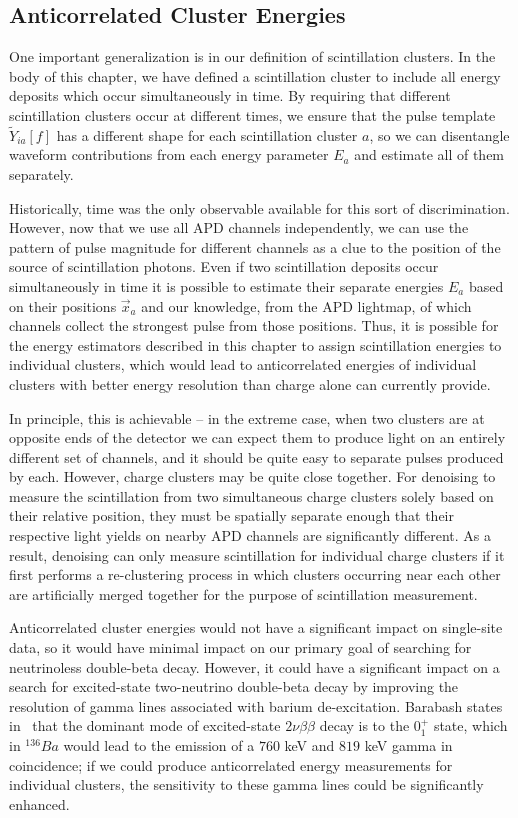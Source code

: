 \subsection{Anticorrelated Cluster Energies}\label{sec:AnticorrelatedClusterEnergies}

One important generalization is in our definition of scintillation clusters.  In the body of this chapter, we have defined a scintillation cluster to include all energy deposits which occur simultaneously in time.  By requiring that different scintillation clusters occur at different times, we ensure that the pulse template $\widetilde{Y}_{ia}[f]$ has a different shape for each scintillation cluster $a$, so we can disentangle waveform contributions from each energy parameter $E_a$ and estimate all of them separately.

Historically, time was the only observable available for this sort of discrimination.  However, now that we use all APD channels independently, we can use the pattern of pulse magnitude for different channels as a clue to the position of the source of scintillation photons.  Even if two scintillation deposits occur simultaneously in time it is possible to estimate their separate energies $E_a$ based on their positions $\vec{x}_a$ and our knowledge, from the APD lightmap, of which channels collect the strongest pulse from those positions.  Thus, it is possible for the energy estimators described in this chapter to assign scintillation energies to individual clusters, which would lead to anticorrelated energies of individual clusters with better energy resolution than charge alone can currently provide.

In principle, this is achievable -- in the extreme case, when two clusters are at opposite ends of the detector we can expect them to produce light on an entirely different set of channels, and it should be quite easy to separate pulses produced by each.  However, charge clusters may be quite close together.  For denoising to measure the scintillation from two simultaneous charge clusters solely based on their relative position, they must be spatially separate enough that their respective light yields on nearby APD channels are significantly different.  As a result, denoising can only measure scintillation for individual charge clusters if it first performs a re-clustering process in which clusters occurring near each other are artificially merged together for the purpose of scintillation measurement.

Anticorrelated cluster energies would not have a significant impact on single-site data, so it would have minimal impact on our primary goal of searching for neutrinoless double-beta decay.  However, it could have a significant impact on a search for excited-state two-neutrino double-beta decay by improving the resolution of gamma lines associated with barium de-excitation.  Barabash states in~\cite{Barabash2010} that the dominant mode of excited-state $2\nu \beta\beta$ decay is to the $0^{+}_1$ state, which in $^{136}Ba$ would lead to the emission of a $760$ keV and $819$ keV gamma in coincidence; if we could produce anticorrelated energy measurements for individual clusters, the sensitivity to these gamma lines could be significantly enhanced.


